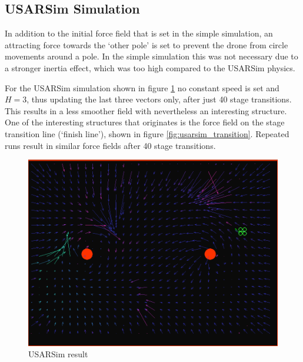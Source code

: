 \documentclass[11pt]{article}
\begin{document}
\subsection{USARSim Simulation}

In addition to the initial force field that is set in the simple simulation, an attracting force towards the `other pole' is set to prevent the drone from circle movements around a pole. In the simple simulation this was not necessary due to a stronger inertia effect, which was too high compared to the USARSim physics.

For the USARSim simulation shown in figure \ref{fig:usarsim_result1} no constant speed is set and $H = 3$, thus updating the last three vectors only, after just 40 stage transitions. This results in a less smoother field with nevertheless an interesting structure. One of the interesting structures that originates is the force field on the stage transition line (`finish line'), shown in figure \ref{fig:usarsim_transition}. Repeated runs result in similar force fields after 40 stage transitions.

  \begin{figure}
    \includegraphics[width=1.0\textwidth]{img/usarsim_result1}
    \caption{USARSim result}
    \label{fig:usarsim_result1}
  \end{figure}
\end{document}
